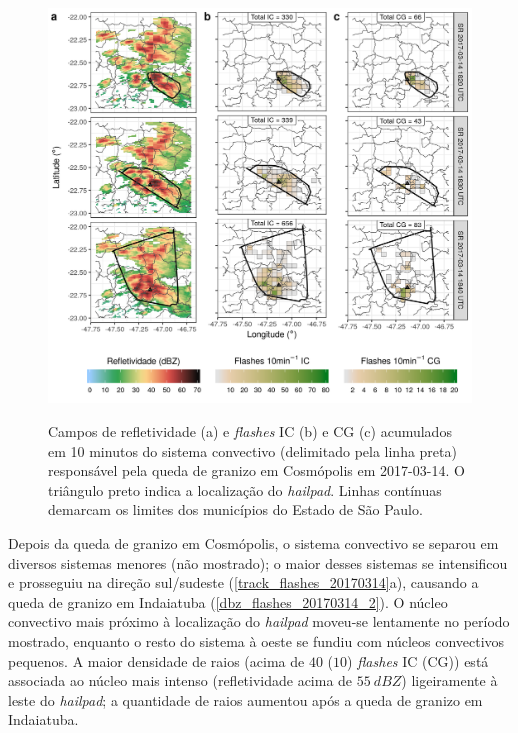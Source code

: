 \begin{figure}[htb]
	\centering
	\caption{Campos de refletividade (a) e \textit{flashes} IC (b) e CG (c) acumulados em 10 minutos do sistema convectivo (delimitado pela linha preta) responsável pela queda de granizo em Cosmópolis em 2017-03-14. O triângulo preto indica a localização do \textit{hailpad}. Linhas contínuas demarcam os limites dos municípios do Estado de São Paulo.} 
	\label{dbz_flashes_20170314_1}
	\includegraphics[width=0.99\columnwidth]{../General_Processing/figures/clusters_flashes_2017-03-14_1830_ptbr.png} \\
\end{figure}

Depois da queda de granizo em Cosmópolis, o sistema convectivo se separou em diversos sistemas menores (não mostrado); o maior desses sistemas se intensificou e prosseguiu na direção sul/sudeste (\autoref{track_flashes_20170314}a), causando a queda de granizo em Indaiatuba (\autoref{dbz_flashes_20170314_2}). O núcleo convectivo mais próximo à localização do \textit{hailpad} moveu-se lentamente no período mostrado, enquanto o resto do sistema à oeste se fundiu com núcleos convectivos pequenos. A maior densidade de raios (acima de $40$ ($10$) \textit{flashes} IC (CG)) está associada ao núcleo mais intenso (refletividade acima de $55\:dBZ$) ligeiramente à leste do \textit{hailpad}; a quantidade de raios aumentou após a queda de granizo em Indaiatuba. 

